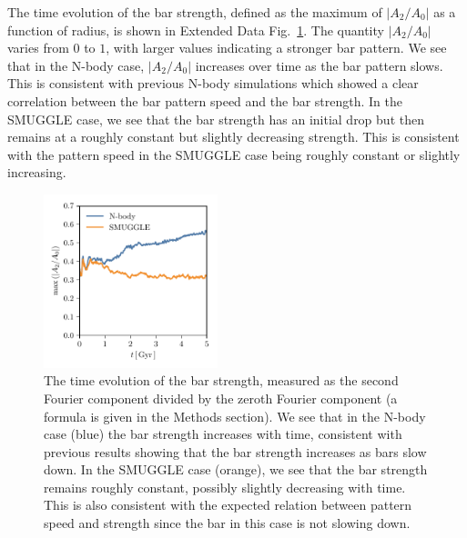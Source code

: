 \documentclass{natureprintstyle}
\begin{document}
The time evolution of the bar strength, defined as the maximum of
$\left|A_2/A_0\right|$ as a function of radius, is shown in Extended Data
Fig.~\ref{fig:strength}. The quantity $\left|A_2/A_0\right|$ varies from $0$
to $1$, with larger values indicating a stronger bar pattern. We see that in
the N-body case, $\left|A_2/A_0\right|$ increases over time as the bar pattern
slows. This is consistent with previous N-body simulations which showed a
clear correlation between the bar pattern speed and the bar
strength.\cite{2003MNRAS.341.1179A} In the SMUGGLE case, we see that the bar
strength has an initial drop but then remains at a roughly constant but
slightly decreasing strength. This is consistent with the pattern speed in the
SMUGGLE case being roughly constant or slightly increasing.

\begin{figure}[h]%
\centering
\includegraphics[width=0.45\textwidth]{fig/fig-A2.pdf}
\caption{The time evolution of the bar strength, measured as the second
Fourier component divided by the zeroth Fourier component (a formula is given
in the Methods section). We see that in the N-body case (blue) the bar
strength increases with time, consistent with previous results showing that
the bar strength increases as bars slow down. In the SMUGGLE case (orange), we
see that the bar strength remains roughly constant, possibly slightly
decreasing with time. This is also consistent with the expected relation
between pattern speed and strength since the bar in this case is not slowing
down.}
\label{fig:strength}
\end{figure}
\end{document}
